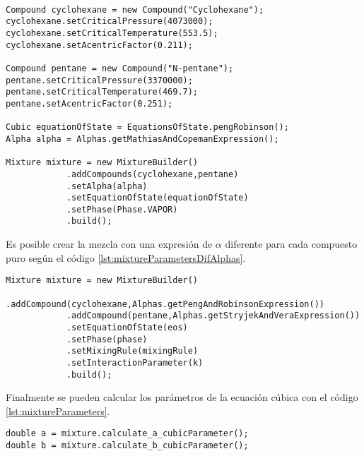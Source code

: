 \begin{lstlisting}[caption={Creación de una mezcla con la clase `MixtureBuilder' asignando la misma expresión de $\alpha$ para cada compuesto puro.}, label={lst:mixtureParameters} ]

Compound cyclohexane = new Compound("Cyclohexane");
cyclohexane.setCriticalPressure(4073000);
cyclohexane.setCriticalTemperature(553.5);
cyclohexane.setAcentricFactor(0.211);

Compound pentane = new Compound("N-pentane");
pentane.setCriticalPressure(3370000);
pentane.setCriticalTemperature(469.7);
pentane.setAcentricFactor(0.251);

Cubic equationOfState = EquationsOfState.pengRobinson();
Alpha alpha = Alphas.getMathiasAndCopemanExpression();

Mixture mixture = new MixtureBuilder()
			.addCompounds(cyclohexane,pentane)
			.setAlpha(alpha)
			.setEquationOfState(equationOfState)
			.setPhase(Phase.VAPOR)
			.build();

\end{lstlisting}

Es posible crear la mezcla con una expresión de $\alpha$ diferente para cada compuesto puro según el código \ref{lst:mixtureParametersDifAlphas}. 


\begin{lstlisting}[caption={Código para el cálculo de los parámetros de la ecuación de estado en una mezcla, con diferentes expresiones de $\alpha$},label={lst:mixtureParametersDifAlphas}]
Mixture mixture = new MixtureBuilder()
			.addCompound(cyclohexane,Alphas.getPengAndRobinsonExpression())
			.addCompound(pentane,Alphas.getStryjekAndVeraExpression())
			.setEquationOfState(eos)
			.setPhase(phase)
			.setMixingRule(mixingRule)
			.setInteractionParameter(k)
			.build();
\end{lstlisting}

Finalmente se pueden calcular los parámetros de la ecuación cúbica con el código \ref{lst:mixtureParameters}.

\begin{lstlisting}[caption={Cálculo de parámetros de la mezcla},label={lst:mixtureParameters}]
double a = mixture.calculate_a_cubicParameter();
double b = mixture.calculate_b_cubicParameter();
\end{lstlisting}
